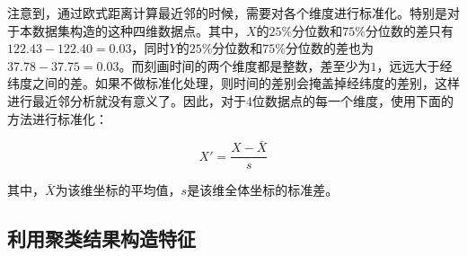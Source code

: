 注意到，通过欧式距离计算最近邻的时候，需要对各个维度进行标准化。特别是对于本数据集构造的这种四维数据点。其中，$X$的$25\%$分位数和$75\%$分位数的差只有$122.43 - 122.40 = 0.03$，同时$Y$的$25\%$分位数和$75\%$分位数的差也为$37.78 - 37.75 = 0.03$。而刻画时间的两个维度都是整数，差至少为$1$，远远大于经纬度之间的差。如果不做标准化处理，则时间的差别会掩盖掉经纬度的差别，这样进行最近邻分析就没有意义了。因此，对于4位数据点的每一个维度，使用下面的方法进行标准化：

\begin{equation*}
    X' = \frac{X - \bar{X}}{s}
\end{equation*}

其中，$\bar{X}$为该维坐标的平均值，$s$是该维全体坐标的标准差。

\subsection{利用聚类结果构造特征}





